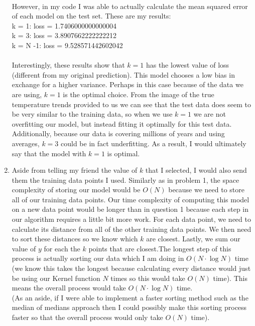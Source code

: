 \documentclass[submit]{harvardml}
\begin{document}
\begin{enumerate}
    \\
    However, in my code I was able to actually calculate the mean squared error of each model on the test set. These are my results:\\
    k = 1: loss = 1.7406000000000004\\
    k = 3: loss = 3.8907662222222212\\
    k = N -1: loss = 9.528571442602042 \\
    \\
    Interestingly, these results show that $k=1$ has the lowest value of loss (different from my original prediction). This model chooses a low bias in exchange for a higher variance. Perhaps in this case because of the data we are using, $k=1$ is the optimal choice. From the image of the true temperature trends provided to us we can see that the test data does seem to be very similar to the training data, so when we use $k=1$ we are not overfitting our model, but instead fitting it optimally for this test data. Additionally, because our data is covering millions of years and using averages, $k=3$ could be in fact underfitting. As a result, I would ultimately say that the model with $k=1$ is optimal.\\
    \item
    Aside from telling my friend the value of $k$ that I selected, I would also send them the training data points I used. Similarly as in problem 1, the space complexity of storing our model would be $O(N)$ because we need to store all of our training data points. Our time complexity of computing this model on a new data point would be longer than in question 1 because each step in our algorithm requires a little bit more work. For each data point, we need to calculate its distance from all of the other training data points. We then need to sort these distances so we know which $k$ are closest. Lastly, we sum our value of $y$ for each the $k$ points that are closest.The longest step of this process is actually sorting our data which I am doing in $O(N\cdot \log N)$ time (we know this takes the longest because calculating every distance would just be using our Kernel function $N$ times so this would take $O(N)$ time). This means the overall process would take $O(N\cdot \log N)$ time. \\
    (As an aside, if I were able to implement a faster sorting method such as the median of medians approach then I could possibly make this sorting process faster so that the overall process would only take $O(N)$ time).\\
    
\end{enumerate}
\end{document}
